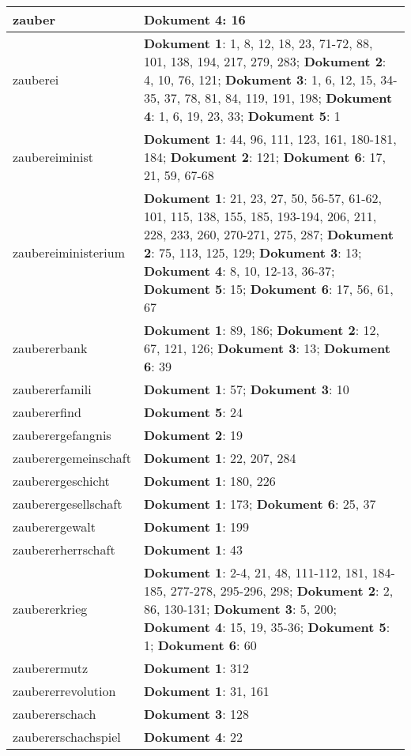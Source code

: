 \documentclass[a5paper]{article}
\begin{document}
\begin{longtable}[l]{|l|p{3in}|}
\hline
zauber & \textbf{Dokument 4}: 16 \\
\hline
zauberei & \textbf{Dokument 1}: 1, 8, 12, 18, 23, 71-72, 88, 101, 138, 194, 217, 279, 283; \textbf{Dokument 2}: 4, 10, 76, 121; \textbf{Dokument 3}: 1, 6, 12, 15, 34-35, 37, 78, 81, 84, 119, 191, 198; \textbf{Dokument 4}: 1, 6, 19, 23, 33; \textbf{Dokument 5}: 1 \\
\hline
zaubereiminist & \textbf{Dokument 1}: 44, 96, 111, 123, 161, 180-181, 184; \textbf{Dokument 2}: 121; \textbf{Dokument 6}: 17, 21, 59, 67-68 \\
\hline
zaubereiministerium & \textbf{Dokument 1}: 21, 23, 27, 50, 56-57, 61-62, 101, 115, 138, 155, 185, 193-194, 206, 211, 228, 233, 260, 270-271, 275, 287; \textbf{Dokument 2}: 75, 113, 125, 129; \textbf{Dokument 3}: 13; \textbf{Dokument 4}: 8, 10, 12-13, 36-37; \textbf{Dokument 5}: 15; \textbf{Dokument 6}: 17, 56, 61, 67 \\
\hline
zaubererbank & \textbf{Dokument 1}: 89, 186; \textbf{Dokument 2}: 12, 67, 121, 126; \textbf{Dokument 3}: 13; \textbf{Dokument 6}: 39 \\
\hline
zaubererfamili & \textbf{Dokument 1}: 57; \textbf{Dokument 3}: 10 \\
\hline
zaubererfind & \textbf{Dokument 5}: 24 \\
\hline
zauberergefangnis & \textbf{Dokument 2}: 19 \\
\hline
zauberergemeinschaft & \textbf{Dokument 1}: 22, 207, 284 \\
\hline
zauberergeschicht & \textbf{Dokument 1}: 180, 226 \\
\hline
zauberergesellschaft & \textbf{Dokument 1}: 173; \textbf{Dokument 6}: 25, 37 \\
\hline
zauberergewalt & \textbf{Dokument 1}: 199 \\
\hline
zaubererherrschaft & \textbf{Dokument 1}: 43 \\
\hline
zaubererkrieg & \textbf{Dokument 1}: 2-4, 21, 48, 111-112, 181, 184-185, 277-278, 295-296, 298; \textbf{Dokument 2}: 2, 86, 130-131; \textbf{Dokument 3}: 5, 200; \textbf{Dokument 4}: 15, 19, 35-36; \textbf{Dokument 5}: 1; \textbf{Dokument 6}: 60 \\
\hline
zauberermutz & \textbf{Dokument 1}: 312 \\
\hline
zaubererrevolution & \textbf{Dokument 1}: 31, 161 \\
\hline
zaubererschach & \textbf{Dokument 3}: 128 \\
\hline
zaubererschachspiel & \textbf{Dokument 4}: 22 \\

\end{longtable}
\end{document}
